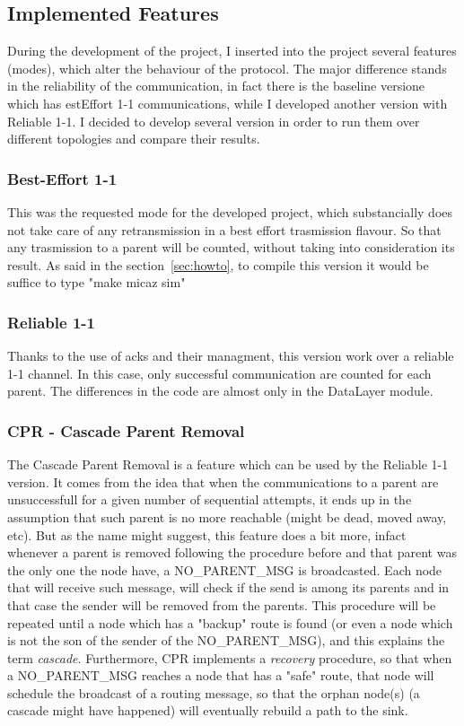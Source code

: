 \documentclass{article}
\begin{document}
\subsection{Implemented Features}
During the development of the project, I inserted into the project several features (modes), which alter the behaviour of the protocol. The major difference stands in the reliability of the communication, in fact there is the baseline versione which has estEffort 1-1 communications, while I developed another version with Reliable 1-1. I decided to develop several version in order to run them over different topologies and compare their results.
\subsubsection{Best-Effort 1-1}
This was the requested mode for the developed project, which substancially does not take care of any retransmission in a best effort trasmission flavour. So that any trasmission to a parent will be counted, without taking into consideration its result. As said in the section~\ref{sec:howto}, to compile this version it would be suffice to type "make micaz sim"
\subsubsection{Reliable 1-1}
Thanks to the use of acks and their managment, this version work over a reliable 1-1 channel. In this case, only successful communication are counted for each parent. The differences in the code are almost only in the DataLayer module.
\subsubsection{CPR - Cascade Parent Removal}
The Cascade Parent Removal is a feature which can be used by the Reliable 1-1 version. It comes from the idea that when the communications to a parent are unsuccessfull for a given number of sequential attempts, it ends up in the assumption that such parent is no more reachable (might be dead, moved away, etc). But as the name might suggest, this feature does a bit more, infact whenever a parent is removed following the procedure before and that parent was the only one the node have, a NO\_PARENT\_MSG is broadcasted. Each node that will receive such message, will check if the send is among its parents and in that case the sender will be removed from the parents. This procedure will be repeated until  a node which has a "backup" route is found (or even a node which is not the son of the sender of the NO\_PARENT\_MSG), and this explains the term \textit{cascade}.
Furthermore, CPR implements a \textit{recovery} procedure, so that when a NO\_PARENT\_MSG reaches a node that has a "safe" route, that node will schedule the broadcast of a routing message, so that the orphan node(s) (a cascade might have happened) will eventually rebuild a path to the sink.
\end{document}
